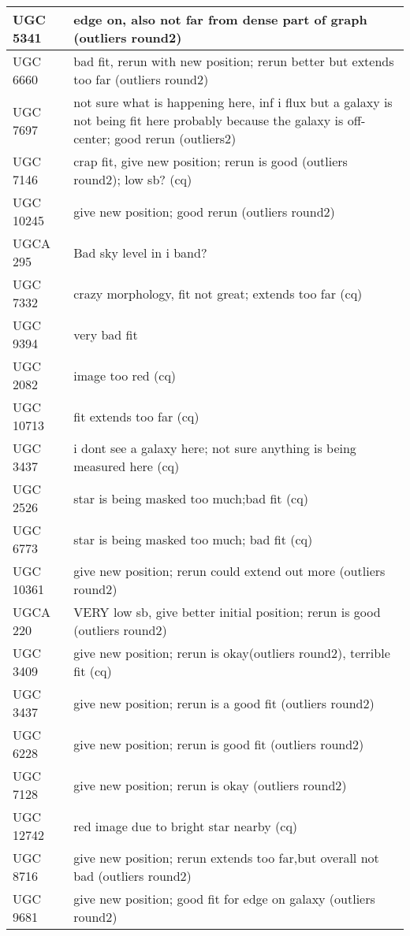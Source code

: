 \documentclass[10pt]{article}
\begin{document}
\begin{landscape}
\begin{longtable}{|l|l|}
UGC 5341 & edge on, also not far from dense part of graph (outliers round2)\\ \hline
UGC 6660 & bad fit, rerun with new position; rerun better but extends too far (outliers round2)\\ \hline
UGC 7697 & not sure what is happening here, inf i flux but a galaxy is not being fit here probably because the galaxy is off-center; good rerun (outliers2) \\ \hline
UGC 7146 & crap fit, give new position; rerun is good (outliers round2); low sb? (cq) \\ \hline 
UGC 10245 & give new position; good rerun (outliers round2)\\ \hline 
UGCA 295 & Bad sky level in i band?\\ \hline 
UGC 7332 & crazy morphology, fit not great; extends too far (cq)\\ \hline 
UGC 9394 & very bad fit \\ \hline 
UGC 2082 & image too red (cq)\\ \hline 
UGC 10713 & fit extends too far (cq)\\ \hline 
UGC 3437 & i dont see a galaxy here; not sure anything is being measured here (cq)\\ \hline 
UGC 2526 & star is being masked too much;bad fit (cq)\\ \hline 
UGC 6773 & star is being masked too much; bad fit (cq)\\ \hline 
UGC 10361 & give new position; rerun could extend out more (outliers round2)\\ \hline 
UGCA 220 & VERY low sb, give better initial position; rerun is good (outliers round2)\\ \hline 
UGC 3409 & give new position; rerun is okay(outliers round2), terrible fit (cq)\\ \hline 
UGC 3437 & give new position; rerun is a good fit (outliers round2)\\ \hline 
UGC 6228 & give new position; rerun is good fit (outliers round2)\\ \hline 
UGC 7128 & give new position; rerun is okay (outliers round2)\\ \hline 
UGC 12742 & red image due to bright star nearby (cq)\\ \hline
UGC 8716 & give new position; rerun extends too far,but overall not bad (outliers round2)\\ \hline
UGC 9681 & give new position; good fit for edge on galaxy (outliers round2)\\ \hline

\end{longtable}
\end{landscape}
\end{document}
